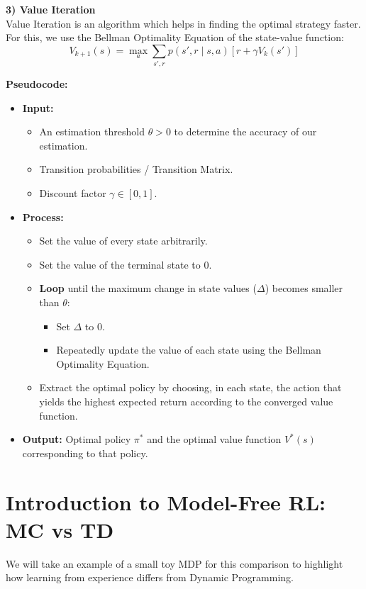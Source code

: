 \textbf{\textcolor{primary}{3) Value Iteration}} \\
Value Iteration is an algorithm which helps in finding the optimal strategy faster. For this, we use the Bellman Optimality Equation of the state-value function:
\[ V_{k+1}(s) = \max_a \sum_{s', r} p(s', r \mid s, a) \left[ r + \gamma V_k(s') \right] \]

\textbf{Pseudocode:}
\begin{itemize}
    \item \textbf{Input:}
    \begin{itemize}
        \item An estimation threshold $\theta > 0$ to determine the accuracy of our estimation.
        \item Transition probabilities / Transition Matrix.
        \item Discount factor $\gamma \in [0,1]$.
    \end{itemize}
    \item \textbf{Process:}
    \begin{itemize}
        \item Set the value of every state arbitrarily.
        \item Set the value of the terminal state to 0.
        \item \textbf{Loop} until the maximum change in state values ($\Delta$) becomes smaller than $\theta$:
        \begin{itemize}
            \item Set $\Delta$ to 0.
            \item Repeatedly update the value of each state using the Bellman Optimality Equation.
        \end{itemize}
        \item Extract the optimal policy by choosing, in each state, the action that yields the highest expected return according to the converged value function.
    \end{itemize}
    \item \textbf{Output:} Optimal policy $\pi^*$ and the optimal value function $V^*(s)$ corresponding to that policy.
\end{itemize}

\section{\textcolor{secondary}{Introduction to Model-Free RL: MC vs TD}}
We will take an example of a small toy MDP for this comparison to highlight how learning from experience differs from Dynamic Programming.

